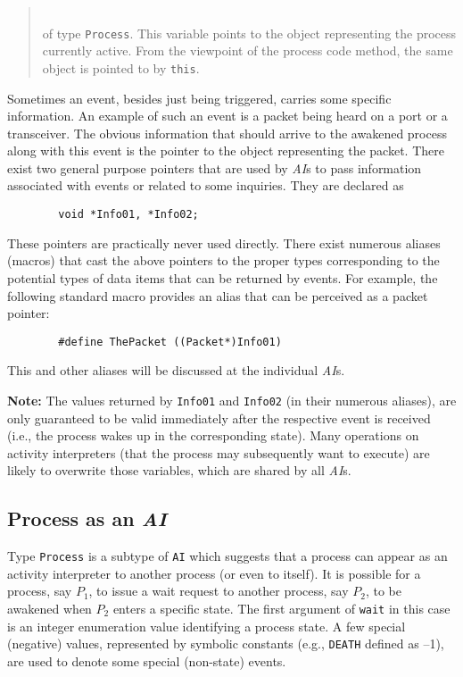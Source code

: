 \begin{quote}
\noindent{}\\ \hspace{0in}
of type {\tt Process}.
This variable points to the object representing the process currently active.
From the viewpoint of the process code method, the same object is pointed
to by {\tt this}.
\end{quote}\medskip

Sometimes an event, besides just being triggered, carries some specific
information.
An example of such an event is a packet being heard on a port or
a transceiver.
The obvious information that should arrive to the awakened process
along with this event is the pointer to the object representing the packet.
There exist two general purpose pointers that are used by {\em AI\/}s
to pass information associated with events or related to some inquiries.
They are declared as
\begin{verbatim}
        void *Info01, *Info02;
\end{verbatim}

These pointers are practically never used directly.
There exist numerous aliases (macros) that cast the above pointers to the
proper types corresponding to the potential types of
data items that can be returned by events.
For example, the following standard macro provides an alias
that can be perceived as a packet pointer:
\begin{verbatim}
        #define ThePacket ((Packet*)Info01)
\end{verbatim}
This and other aliases will be discussed at the individual {\em AI\/}s.

\noindent
{\bf Note:}
The values returned by {\tt Info01} and {\tt Info02} (in their numerous
aliases), are only guaranteed to be valid immediately after the
respective event is received (i.e., the process wakes up in the
corresponding state).
Many operations on activity interpreters (that the process may subsequently
want to execute) are likely to overwrite those variables, which are
shared by all {\em AI\/}s.

\subsection{Process as an {\em AI}}
\label{rm_pr_pa}

Type {\tt Process} is a subtype of {\tt AI} which suggests that a process
can appear as an activity interpreter to another process (or even to itself).
It is possible for a process, say $P_1$, to issue a wait request to
another process, say $P_2$, to be awakened when $P_2$ enters a
specific state.
The first argument of {\tt wait} in this case is an integer enumeration
value identifying a process state.
A few special (negative) values, represented by symbolic constants
(e.g., {\tt DEATH} defined as --1), are used to denote some
special (non-state) events.

